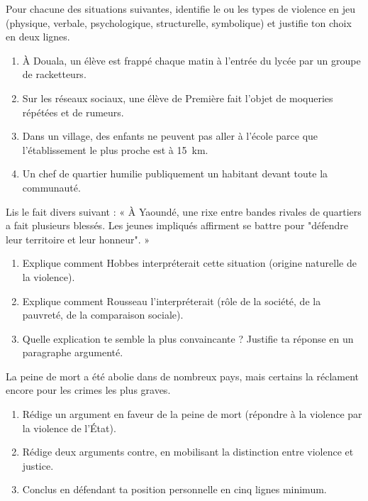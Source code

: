 \documentclass[11pt]{article}
\newcounter{popsec}
\newcounter{popsub}
\newcommand{\courssub}[1]{%
  \stepcounter{popsub}%
  \par\vspace{9pt}\noindent{\popxbold\fontsize{11.5}{13}\selectfont\color{popink}{\color{poporange}\thepopsec.\thepopsub}\hspace{6pt}#1}\par\nopagebreak\vspace{4pt}
}
\begin{document}
\courssub{Je m'entraîne}

\begin{exercice}
Pour chacune des situations suivantes, identifie le ou les types de violence en jeu (physique, verbale, psychologique, structurelle, symbolique) et justifie ton choix en deux lignes.
\begin{enumerate}
\item À Douala, un élève est frappé chaque matin à l'entrée du lycée par un groupe de racketteurs.
\item Sur les réseaux sociaux, une élève de Première fait l'objet de moqueries répétées et de rumeurs.
\item Dans un village, des enfants ne peuvent pas aller à l'école parce que l'établissement le plus proche est à \SI{15}{km}.
\item Un chef de quartier humilie publiquement un habitant devant toute la communauté.
\end{enumerate}
\end{exercice}

\begin{exercice}
Lis le fait divers suivant : « À Yaoundé, une rixe entre bandes rivales de quartiers a fait plusieurs blessés. Les jeunes impliqués affirment se battre pour "défendre leur territoire et leur honneur". »
\begin{enumerate}
\item Explique comment Hobbes interpréterait cette situation (origine naturelle de la violence).
\item Explique comment Rousseau l'interpréterait (rôle de la société, de la pauvreté, de la comparaison sociale).
\item Quelle explication te semble la plus convaincante ? Justifie ta réponse en un paragraphe argumenté.
\end{enumerate}
\end{exercice}

\begin{exercice}
La peine de mort a été abolie dans de nombreux pays, mais certains la réclament encore pour les crimes les plus graves.
\begin{enumerate}
\item Rédige un argument en faveur de la peine de mort (répondre à la violence par la violence de l'État).
\item Rédige deux arguments contre, en mobilisant la distinction entre violence et justice.
\item Conclus en défendant ta position personnelle en cinq lignes minimum.
\end{enumerate}
\end{exercice}
\end{document}
